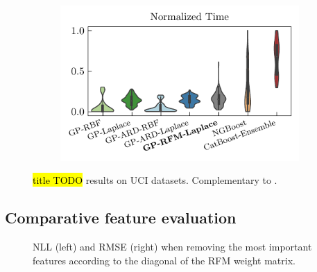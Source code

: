 \begin{figure}[htb]
\begin{subfigure}[b]{0.475\textwidth}
    \end{subfigure}
    \hfill
    \begin{subfigure}[b]{0.475\textwidth}   
        \centering 
        \includegraphics[width=\textwidth]{figures/uci_time.pdf}
    \end{subfigure}
    \caption{
        \hl{title TODO} results on UCI datasets. Complementary to .
        } 
    \label{fig:main-uci}
\end{figure}



\subsection{Comparative feature evaluation}



\begin{figure}[htb]
    \centering
    \begin{subfigure}[b]{0.475\textwidth}
        \centering
        
    \end{subfigure}
    \hfill
    \begin{subfigure}[b]{0.475\textwidth}  
        \centering
        
    \end{subfigure}
    \caption{NLL (left) and RMSE (right) when removing the most important features according to the diagonal of the RFM weight matrix.} 
    \label{fig:feature-importance}
\end{figure}
    







